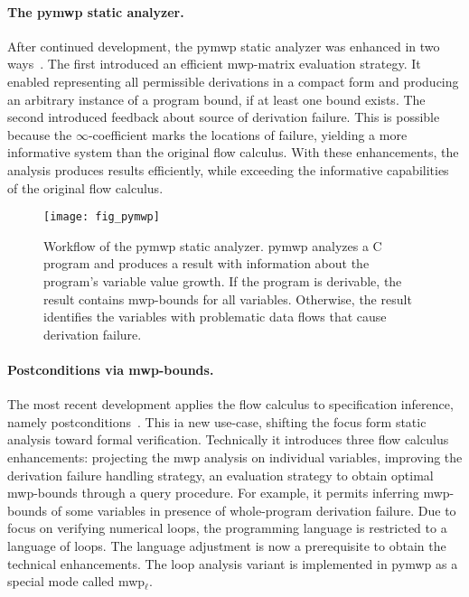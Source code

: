 \paragraph*{The pymwp static analyzer.}
After continued development, the pymwp static analyzer was enhanced in two ways~\cite{aubert2023b}.
The first introduced an efficient mwp-matrix evaluation strategy.
It enabled representing all permissible derivations in a compact form and producing an arbitrary instance of a program bound, if at least one bound exists.
The second introduced feedback about source of derivation failure.
This is possible because the \(\infty\)-coefficient marks the locations of failure, yielding a more informative system than the original flow calculus.
With these enhancements, the analysis produces results efficiently,
while exceeding the informative capabilities of the original flow calculus.

\begin{figure}[t]
\centering
\texttt{[image: fig\_pymwp]}
\caption[The pymwp static analyzer workflow]{
Workflow of the pymwp static analyzer.
pymwp analyzes a C program and produces a result with information about the program's variable value growth.
If the program is derivable, the result contains mwp-bounds for all variables.
Otherwise, the result identifies the variables with problematic data flows that cause derivation failure.
}\label{fig:pymwp}
\end{figure}

\paragraph*{Postconditions via mwp-bounds.}
The most recent development applies the flow calculus to specification inference, namely postconditions~\cite{rusch2025}.
This ia new use-case, shifting the focus form static analysis toward formal verification.
Technically it introduces three flow calculus enhancements:
projecting the mwp analysis on individual variables, improving the derivation failure handling strategy, an evaluation strategy to obtain optimal mwp-bounds through a query procedure.
For example, it permits inferring mwp-bounds of some variables in presence of whole-program derivation failure.
Due to focus on verifying numerical loops, the programming language is restricted to a language of loops.
The language adjustment is now a prerequisite to obtain the technical enhancements.
The loop analysis variant is implemented in pymwp as a special mode called mwp\(_\ell\).

